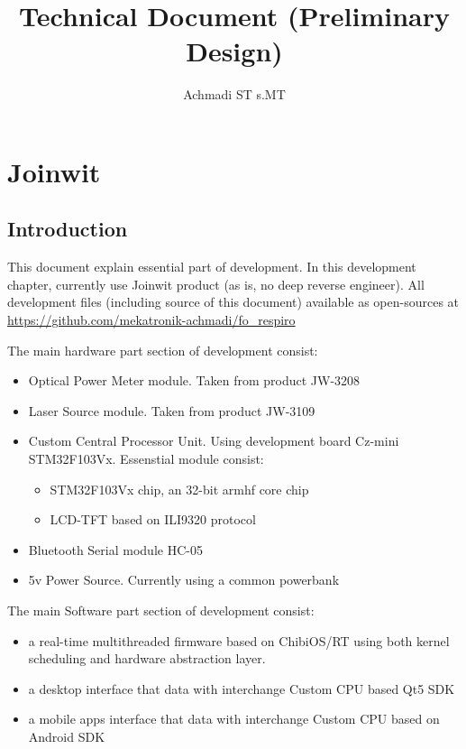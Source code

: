 \documentclass[12pt,]{book}
\title{\Large \bf
	Technical Document (Preliminary Design)
}
\author{Achmadi ST s.MT}
\date{}
\begin{document}
	
	\maketitle
	\thispagestyle{empty}
	\pagestyle{empty}
	
	\newpage
	\tableofcontents
	
	\newpage
	\chapter{Joinwit}

	\section{Introduction}
	
	\hspace{10pt} This document explain essential part of development.
	In this development chapter, currently use Joinwit product (as is, no deep reverse engineer).
	All development files (including source of this document) available as open-sources at \url{https://github.com/mekatronik-achmadi/fo_respiro}
	
	The main hardware part section of development consist:
	\begin{itemize}
		\item Optical Power Meter module. Taken from product JW-3208
		\item Laser Source module. Taken from product JW-3109
		\item Custom Central Processor Unit. Using development board Cz-mini STM32F103Vx. Essenstial module consist:
		\begin{itemize}
			\item STM32F103Vx chip, an 32-bit armhf core chip
			\item LCD-TFT based on ILI9320 protocol  
		\end{itemize}
		\item Bluetooth Serial module HC-05
		\item 5v Power Source. Currently using a common powerbank 	
	\end{itemize}

	The main Software part section of development consist:
	\begin{itemize}
		\item a real-time multithreaded firmware based on ChibiOS/RT using both kernel scheduling and hardware abstraction layer.
		\item a desktop interface that data with interchange Custom CPU based Qt5 SDK
		\item a mobile apps interface that data with interchange Custom CPU based on Android SDK
	\end{itemize}
\end{document}
